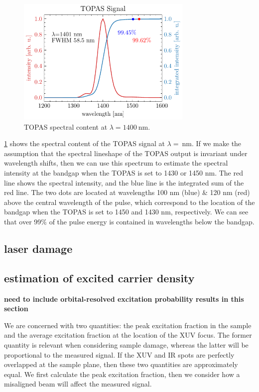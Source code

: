 \begin{figure}
	\centering
	\includegraphics[width=0.75\textwidth]{figures/chap4/TOPAS_1400nm_spectral_inten.pdf}
	\caption{TOPAS spectral content at $\lambda = 1400 \ \textrm{nm}$.}
	\label{fig:TOPAS_1400nm_spectral_inten}
\end{figure}

\cref{fig:TOPAS_1400nm_spectral_inten} shows the spectral content of the TOPAS signal at $\lambda = \ \textrm{nm}$. If we make the assumption that the spectral lineshape of the TOPAS output is invariant under wavelength shifts, then we can use this spectrum to estimate the spectral intensity at the bandgap when the TOPAS is set to 1430 or 1450 nm. The red line shows the spectral intensity, and the blue line is the integrated sum of the red line. The two dots are located at wavelengths 100 nm (blue) \& 120 nm (red) above the central wavelength of the pulse, which correspond to the location of the bandgap when the TOPAS is set to 1450 and 1430 nm, respectively. We can see that over 99\% of the pulse energy is contained in wavelengths below the bandgap.


\subsection{laser damage}

\subsection{estimation of excited carrier density}

\textbf{need to include orbital-resolved excitation probability results in this section}

We are concerned with two quantities: the peak excitation fraction in the sample and the average excitation fraction at the location of the XUV focus. The former quantity is relevant when considering sample damage, whereas the latter will be proportional to the measured signal. If the XUV and IR spots are perfectly overlapped at the sample plane, then these two quantities are approximately equal. We first calculate the peak excitation fraction, then we consider how a misaligned beam will affect the measured signal.

